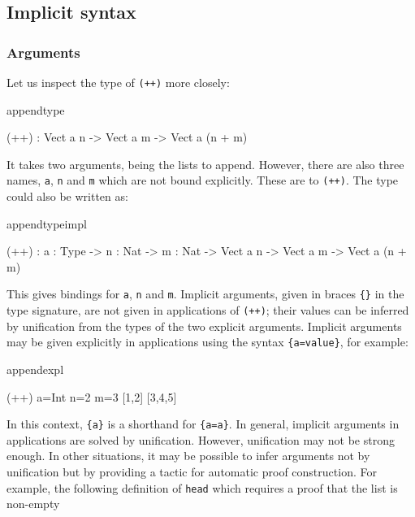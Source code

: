 \subsection{Implicit syntax}

\subsubsection{Arguments}

Let us inspect the type of \texttt{(++)} more closely:

\begin{SaveVerbatim}{appendtype}

(++) : Vect a n -> Vect a m -> Vect a (n + m)

\end{SaveVerbatim}

\noindent
It takes two arguments, being the lists to append. However, there are also
three names, \texttt{a}, \texttt{n} and \texttt{m} which are not bound
explicitly. These are  to \texttt{(++)}. The
type could also be written as:

\begin{SaveVerbatim}{appendtypeimpl}

(++) : {a : Type} -> {n : Nat} -> {m : Nat} ->
       Vect a n -> Vect a m -> Vect a (n + m)

\end{SaveVerbatim}

\noindent
This gives bindings for \texttt{a}, \texttt{n} and \texttt{m}. Implicit
arguments, given in braces \texttt{\{\}} in the type signature, are not
given in applications of \texttt{(++)}; their values can be inferred 
by unification from the types of the two explicit arguments. Implicit arguments
may be given explicitly in applications using the syntax \texttt{\{a=value\}},
for example:

\begin{SaveVerbatim}{appendexpl}

(++) {a=Int} {n=2} {m=3} [1,2] [3,4,5]

\end{SaveVerbatim}

\noindent
In this context, \texttt{\{a\}} is a shorthand for \texttt{\{a=a\}}. In
general, implicit arguments in applications are solved by unification. However,
unification may not be strong enough.
In other situations, it may be possible to infer arguments not by unification
but by providing a tactic for automatic proof construction.
For example, the following definition of \texttt{head} which requires a proof
that the list is non-empty

